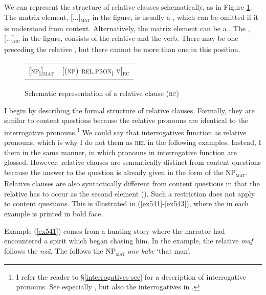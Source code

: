 We can represent the structure of relative clauses schematically, as in Figure \ref{relclause}. The matrix element, [...]\textsubscript{\textsc{mat}} in the figure, is usually a , which can be omitted if it is understood from context. Alternatively, the matrix element can be a . The , [...]\textsubscript{\textsc{rc}} in the figure, consists of the relative  and the verb. There may be one  preceding the relative , but there cannot be more than one  in this position.

\begin{figure}  
	\begin{tabular}{ll}
			[\textsc{np}\textsubscript{i}]\textsubscript{\textsc{mat}}& [(\textsc{np}) \textsc{rel.pron}\textsubscript{i} \textsc{v}]\textsubscript{\textsc{rc}}\\
	\end{tabular}
	\caption{Schematic representation of a relative clause (\textsc{rc})}
	\label{relclause} 
\end{figure}%

I begin by describing the formal structure of relative clauses. Formally, they are similar to content questions because the relative pronouns are identical to the interrogative pronouns.\footnote{I refer the reader to {\S}\ref{interrogatives-sec} for a description of interrogative pronouns. See especially , but also the interrogatives in .} We could say that interrogatives function as relative pronouns, which is why I do not  them as \textsc{rel} in the following examples. Instead, I  them in the same manner, in which pronouns in interrogative function are glossed. However, relative clauses are semantically distinct from content questions because the answer to the question is already given in the form of the NP\textsubscript{\textsc{mat}}. Relative clauses are also syntactically different from content questions in that the relative  has to occur as the second element (). Such a restriction does not apply to content questions. This is illustrated in (\ref{ex541}-\ref{ex543}), where the  in each example is printed in bold face.

Example (\ref{ex541}) comes from a hunting story where the narrator had encountered a spirit which began chasing him. In the example, the relative  \emph{maf} follows the  \emph{nzä}. The  follows the NP\textsubscript{\textsc{mat}} \emph{ane kabe} `that man'.

